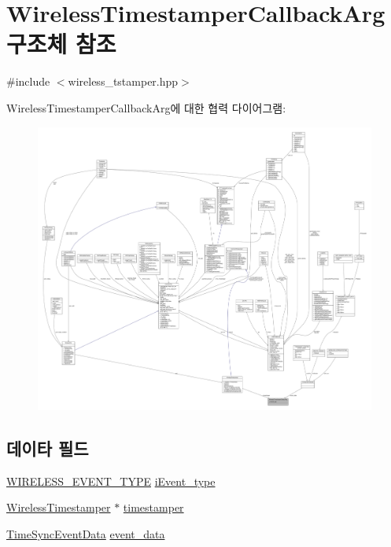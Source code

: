 \hypertarget{struct_wireless_timestamper_callback_arg}{}\section{Wireless\+Timestamper\+Callback\+Arg 구조체 참조}
\label{struct_wireless_timestamper_callback_arg}


{\ttfamily \#include $<$wireless\+\_\+tstamper.\+hpp$>$}



Wireless\+Timestamper\+Callback\+Arg에 대한 협력 다이어그램\+:
\nopagebreak
\begin{figure}[H]
\begin{center}
\leavevmode
\includegraphics[width=350pt]{struct_wireless_timestamper_callback_arg__coll__graph}
\end{center}
\end{figure}
\subsection*{데이타 필드}
\begin{DoxyCompactItemize}
\item 
\hyperlink{wireless__tstamper_8hpp_af5e1de4a157974fc2825521b20b357b1}{W\+I\+R\+E\+L\+E\+S\+S\+\_\+\+E\+V\+E\+N\+T\+\_\+\+T\+Y\+PE} \hyperlink{struct_wireless_timestamper_callback_arg_a73268234eb2338c6296c2b78e4685a66}{i\+Event\+\_\+type}
\item 
\hyperlink{class_wireless_timestamper}{Wireless\+Timestamper} $\ast$ \hyperlink{struct_wireless_timestamper_callback_arg_a63b4bb264af088830cdb1fea4e6ad126}{timestamper}
\item 
\hyperlink{union_time_sync_event_data}{Time\+Sync\+Event\+Data} \hyperlink{struct_wireless_timestamper_callback_arg_a0cb3aa66097f2f3c9bafc9aeb88b4c9c}{event\+\_\+data}
\end{DoxyCompactItemize}


